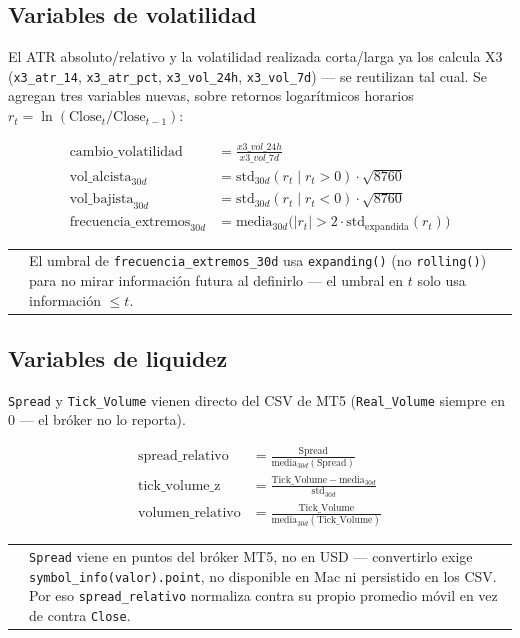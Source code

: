 \documentclass[11pt,a4paper]{article}
\makeatletter
\newcommand{\code}[1]{\texttt{\small #1}}
\newenvironment{nota}{%
  \par\medskip\noindent
  \begin{tabular}{@{}p{0.4em}@{\hspace{8pt}}p{\dimexpr\linewidth-2em\relax}@{}}
  \textcolor{cnaranja}{\rule{3pt}{1.1em}} &
}{\end{tabular}\par\medskip}
\makeatother
\begin{document}
\subsection{Variables de volatilidad}

El ATR absoluto/relativo y la volatilidad realizada corta/larga ya los calcula X3
(\code{x3\_atr\_14}, \code{x3\_atr\_pct}, \code{x3\_vol\_24h}, \code{x3\_vol\_7d}) — se
reutilizan tal cual. Se agregan tres variables nuevas, sobre retornos logarítmicos
horarios \(r_t = \ln(\text{Close}_t / \text{Close}_{t-1})\):

\begin{align}
\text{cambio\_volatilidad} &= \frac{x3\_vol\_24h}{x3\_vol\_7d} \\
\text{vol\_alcista}_{30d} &= \mathrm{std}_{30d}(r_t \mid r_t > 0) \cdot \sqrt{8760} \\
\text{vol\_bajista}_{30d} &= \mathrm{std}_{30d}(r_t \mid r_t < 0) \cdot \sqrt{8760} \\
\text{frecuencia\_extremos}_{30d} &= \mathrm{media}_{30d}\big(|r_t| > 2\cdot
  \mathrm{std}_{\mathrm{expandida}}(r_t)\big)
\end{align}

\begin{nota}
El umbral de \code{frecuencia\_extremos\_30d} usa \code{expanding()} (no \code{rolling()})
para no mirar información futura al definirlo — el umbral en \(t\) solo usa información
\(\leq t\).
\end{nota}

\subsection{Variables de liquidez}

\code{Spread} y \code{Tick\_Volume} vienen directo del CSV de MT5 (\code{Real\_Volume}
siempre en 0 — el bróker no lo reporta).

\begin{align}
\text{spread\_relativo} &= \frac{\text{Spread}}{\mathrm{media}_{30d}(\text{Spread})} \\
\text{tick\_volume\_z} &= \frac{\text{Tick\_Volume} - \mathrm{media}_{30d}}
  {\mathrm{std}_{30d}} \\
\text{volumen\_relativo} &= \frac{\text{Tick\_Volume}}{\mathrm{media}_{30d}
  (\text{Tick\_Volume})}
\end{align}

\begin{nota}
\code{Spread} viene en puntos del bróker MT5, no en USD — convertirlo exige
\code{symbol\_info(valor).point}, no disponible en Mac ni persistido en los CSV. Por eso
\code{spread\_relativo} normaliza contra su propio promedio móvil en vez de contra
\code{Close}.
\end{nota}
\end{document}

